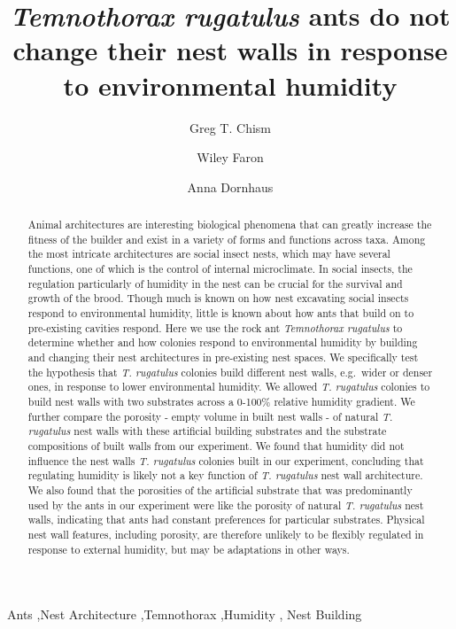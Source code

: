 \documentclass[3p]{elsarticle} %
\begin{document}
\begin{frontmatter}

  \title{\emph{Temnothorax rugatulus} ants do not change their nest
walls in response to environmental humidity}
    \author[a]{Greg T. Chism}
    \author[b]{Wiley Faron}
  
    \author[c]{Anna Dornhaus}
  
  
  \begin{abstract}
  Animal architectures are interesting biological phenomena that can
  greatly increase the fitness of the builder and exist in a variety of
  forms and functions across taxa. Among the most intricate
  architectures are social insect nests, which may have several
  functions, one of which is the control of internal microclimate. In
  social insects, the regulation particularly of humidity in the nest
  can be crucial for the survival and growth of the brood. Though much
  is known on how nest excavating social insects respond to
  environmental humidity, little is known about how ants that build on
  to pre-existing cavities respond. Here we use the rock ant
  \emph{Temnothorax rugatulus} to determine whether and how colonies
  respond to environmental humidity by building and changing their nest
  architectures in pre-existing nest spaces. We specifically test the
  hypothesis that \emph{T. rugatulus} colonies build different nest
  walls, e.g.~wider or denser ones, in response to lower environmental
  humidity. We allowed \emph{T. rugatulus} colonies to build nest walls
  with two substrates across a 0-100\% relative humidity gradient. We
  further compare the porosity - empty volume in built nest walls - of
  natural \emph{T. rugatulus} nest walls with these artificial building
  substrates and the substrate compositions of built walls from our
  experiment. We found that humidity did not influence the nest walls
  \emph{T. rugatulus} colonies built in our experiment, concluding that
  regulating humidity is likely not a key function of \emph{T.
  rugatulus} nest wall architecture. We also found that the porosities
  of the artificial substrate that was predominantly used by the ants in
  our experiment were like the porosity of natural \emph{T. rugatulus}
  nest walls, indicating that ants had constant preferences for
  particular substrates. Physical nest wall features, including
  porosity, are therefore unlikely to be flexibly regulated in response
  to external humidity, but may be adaptations in other ways.
  \end{abstract}
    \begin{keyword}
    Ants \sep Nest Architecture \sep Temnothorax \sep Humidity \sep 
    Nest Building
  \end{keyword}
  
 \end{frontmatter}
\end{document}

